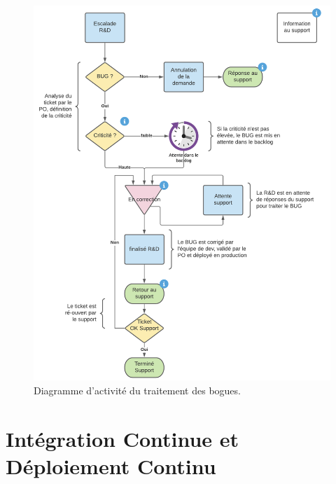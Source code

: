 \begin{appendices}
    \begin{figure}[ht]
        \centering
        \includegraphics[width=\textwidth]{img/lifecycle-of-bugs}
        \caption{Diagramme d'activité du traitement des bogues.}
        \label{fig:lifecycle-of-bugs}
    \end{figure}

    \section{Intégration Continue et Déploiement Continu}\label{sec-a:ci-cd}


\end{appendices}